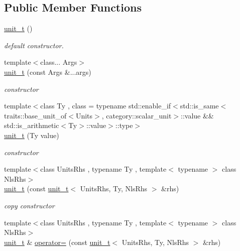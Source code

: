 \subsection*{Public Member Functions}
\begin{DoxyCompactItemize}
\item 
\hypertarget{classunits_1_1unit__t_a7ec1f777253e8a5831a5bb7ad6fdb5e3}{}\hyperlink{classunits_1_1unit__t_a7ec1f777253e8a5831a5bb7ad6fdb5e3}{unit\+\_\+t} ()\label{classunits_1_1unit__t_a7ec1f777253e8a5831a5bb7ad6fdb5e3}

\begin{DoxyCompactList}\small\item\em default constructor. \end{DoxyCompactList}\item 
{\footnotesize template$<$class... Args$>$ }\\\hyperlink{classunits_1_1unit__t_a8a3086127b2fe7ae7f837e1c09ddcd5d}{unit\+\_\+t} (const Args \&...args)
\begin{DoxyCompactList}\small\item\em constructor \end{DoxyCompactList}\item 
{\footnotesize template$<$class Ty , class  = typename std\+::enable\+\_\+if$<$std\+::is\+\_\+same$<$traits\+::base\+\_\+unit\+\_\+of$<$\+Units$>$, category\+::scalar\+\_\+unit$>$\+::value \&\& std\+::is\+\_\+arithmetic$<$\+Ty$>$\+::value$>$\+::type$>$ }\\\hyperlink{classunits_1_1unit__t_a240aa805d5149ebcf2c90f72c0d6561d}{unit\+\_\+t} (Ty value)
\begin{DoxyCompactList}\small\item\em constructor \end{DoxyCompactList}\item 
{\footnotesize template$<$class Units\+Rhs , typename Ty , template$<$ typename $>$ class Nls\+Rhs$>$ }\\\hyperlink{classunits_1_1unit__t_aa50a999bfebc187549f281de23f5afe7}{unit\+\_\+t} (const \hyperlink{classunits_1_1unit__t}{unit\+\_\+t}$<$ Units\+Rhs, Ty, Nls\+Rhs $>$ \&rhs)
\begin{DoxyCompactList}\small\item\em copy constructor \end{DoxyCompactList}\item 
{\footnotesize template$<$class Units\+Rhs , typename Ty , template$<$ typename $>$ class Nls\+Rhs$>$ }\\\hyperlink{classunits_1_1unit__t}{unit\+\_\+t} \& \hyperlink{classunits_1_1unit__t_a181a9e81f77b4237eeb60be8e51de0e6}{operator=} (const \hyperlink{classunits_1_1unit__t}{unit\+\_\+t}$<$ Units\+Rhs, Ty, Nls\+Rhs $>$ \&rhs)

\end{DoxyCompactItemize}
